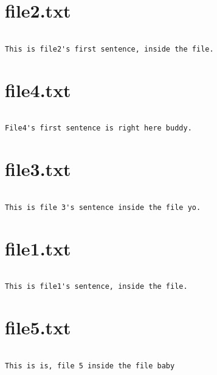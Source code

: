 \section{file2.txt}
\begin{verbatim}

This is file2's first sentence, inside the file.

\end{verbatim}
\section{file4.txt}
\begin{verbatim}

File4's first sentence is right here buddy.

\end{verbatim}
\section{file3.txt}
\begin{verbatim}

This is file 3's sentence inside the file yo.

\end{verbatim}
\section{file1.txt}
\begin{verbatim}

This is file1's sentence, inside the file.

\end{verbatim}
\section{file5.txt}
\begin{verbatim}

This is is, file 5 inside the file baby

\end{verbatim}
